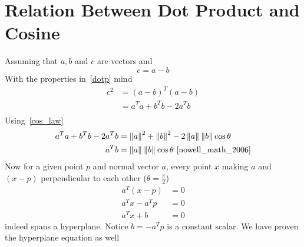 \documentclass{book}
\newcommand{\norm}[2][]{\left\lVert#2\right\rVert_{#1}}
\numberwithin{equation}{subsection}
\begin{document}
\section{Relation Between Dot Product and Cosine}
Assuming that $a, b$ and $c$ are vectors and
\begin{equation}
    c = a-b
\end{equation}
With the properties in~\ref{dotp} mind
\begin{align}
    c^2 &= (a-b)^T(a-b)\\
    &= a^Ta +b^Tb - 2a^Tb\\
\end{align}
Using~\ref{cos_law}
\begin{align}
    a^Ta +b^Tb - 2a^Tb &= \norm{a}^2 + \norm{b}^2 - 2\norm{a}\norm{b}\cos \theta\\
    a^Tb &= \norm{a}\norm{b}\cos \theta~\cite{nowell_math_2006}
\end{align}
Now for a given point $p$ and normal vector $a$, every point $x$ making $a$ and $(x-p)$ perpendicular to each other ($\theta = \frac{\pi}{2}$)
\begin{align}
    a^T(x-p) &= 0\\
    a^Tx-a^Tp &= 0\\
    a^Tx+b &= 0
\end{align}
indeed spans a hyperplane. Notice $b = -a^Tp$ is a constant scalar. We have proven the hyperplane equation as well
\end{document}
